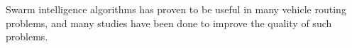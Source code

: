 Swarm intelligence algorithms has proven to be useful in many vehicle routing problems, and many studies have been done to improve the quality of such problems.





